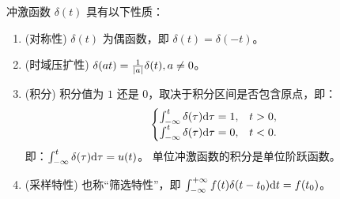 \begin{property}[冲激函数的性质总结]
    冲激函数 $\delta(t)$ 具有以下性质：
    \begin{enumerate}
        \item (对称性) $\delta(t)$ 为偶函数，即 $\delta(t) = \delta(-t)$。
        \item (时域压扩性) $\delta(at) = \frac{1}{\left|a\right|}\delta(t), a \neq 0$。
        \item (积分) 积分值为 $1$ 还是 $0$，取决于积分区间是否包含原点，即：
            \begin{align*}
                \begin{cases}
                    \int_{-\infty}^{t}\delta(\tau)\mathrm{d}\tau = 1, & t > 0, \\
                    \int_{-\infty}^{t}\delta(\tau)\mathrm{d}\tau = 0, & t < 0.
                \end{cases}
            \end{align*}
            即：$\int_{-\infty}^{t}\delta(\tau)\mathrm{d}\tau = u(t)$。
            单位冲激函数的积分是单位阶跃函数。
        \item (采样特性) 也称``筛选特性''，即 $\int_{-\infty}^{+\infty}f(t)\delta(t - t_0)\mathrm{d}t = f(t_0)$。
    \end{enumerate}
\end{property}


